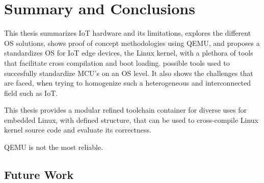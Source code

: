 \chapter{Summary and Conclusions}

This thesis summarizes IoT hardware and its limitations, explores the different OS solutions, shows proof of concept methodologies using QEMU, and proposes a standardizes OS for IoT edge devices, the Linux kernel, with a plethora of tools that facilitate cross compilation and boot loading. 
possible tools used to succesfully standardize MCU's on an OS  level. It also shows the challenges that are faced, when trying to homogenize such a heterogeneous and interconnected field such as IoT. 

This thesis provides a modular refined toolchain container for diverse uses for embedded Linux, with defined structure, that can be used to cross-compile Linux kernel source code and evaluate its correctness. 

QEMU is not the most reliable.

\section{Future Work}